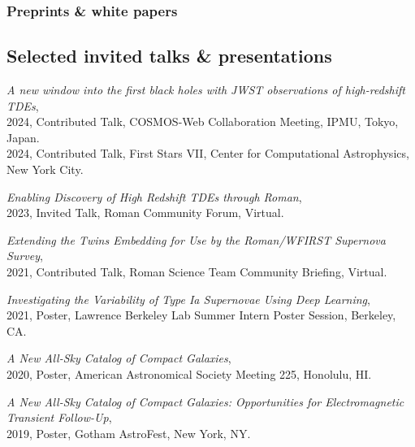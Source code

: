 \documentclass[12pt,letterpaper]{article}
\begin{document}
\subsubsection{Preprints \& white papers}
\begin{list}{}{\cvlist}

\end{list}


\subsection{Selected invited talks \& presentations}
\begin{list}{}{\cvlist}

  \item \emph{A new window into the first black holes with JWST observations of high-redshift TDEs}, \\
      2024, Contributed Talk, COSMOS-Web Collaboration Meeting, IPMU, Tokyo, Japan. \\
      2024, Contributed Talk, First Stars VII, Center for Computational Astrophysics, New York City.

  \item \emph{Enabling Discovery of High Redshift TDEs through Roman}, \\
      2023, Invited Talk, Roman Community Forum, Virtual.
      
  \item \emph{Extending the Twins Embedding for Use by the Roman/WFIRST Supernova Survey}, \\
      2021, Contributed Talk, Roman Science Team Community Briefing, Virtual.

  \item \emph{Investigating the Variability of Type Ia Supernovae Using Deep Learning}, \\
    2021, Poster, Lawrence Berkeley Lab Summer Intern Poster Session, Berkeley, CA.

  \item \emph{A New All-Sky Catalog of Compact Galaxies}, \\
    2020, Poster, American Astronomical Society Meeting 225, Honolulu, HI.

  \item \emph{A New All-Sky Catalog of Compact Galaxies: Opportunities for Electromagnetic Transient Follow-Up}, \\
    2019, Poster, Gotham AstroFest, New York, NY.

\end{list}
\end{document}

